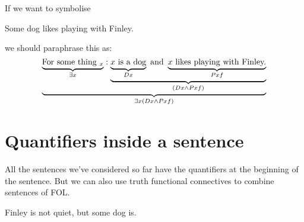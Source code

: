 If we want to symbolise
\begin{earg}
	\item[\ex{lovesesomeonethemselves}] Some dog likes playing with Finley.
\end{earg}

we should paraphrase this as:
\begin{equation*}
\underbrace{\underbrace{\text{For some thing $_x$}}_{\exists x}: \underbrace{
	\underbrace{\text{$x$ is a dog}}_{Dx}
	\text{ and }
	\underbrace{\text{$x$ likes playing with Finley.}}_{Pxf}
}_{(Dx\mathbin{\wedge} Pxf)}}_{\exists x (Dx\mathbin{\wedge} Pxf)}
\end{equation*}

\section{Quantifiers inside a sentence}
All the sentences we've considered so far have the quantifiers at the beginning of the sentence. But we can also use truth functional connectives to combine sentences of FOL.


\begin{earg}
\item[\ex{q.dog}]Finley is not quiet, but some dog is.
\end{earg}

